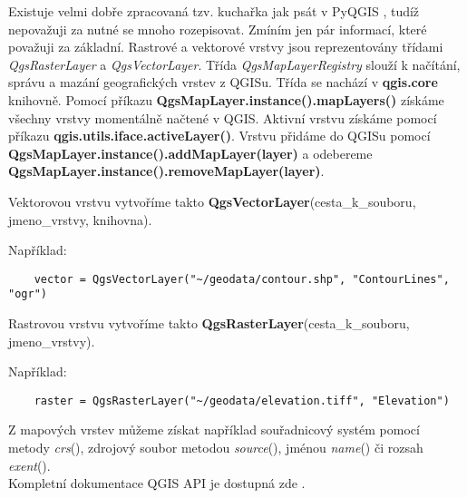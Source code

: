 Existuje velmi dobře zpracovaná tzv. kuchařka jak psát v PyQGIS \cite{pyqgis:www}, tudíž nepovažuji za nutné se mnoho rozepisovat. Zmíním jen pár informací, které považuji za základní. Rastrové a vektorové vrstvy jsou reprezentovány třídami \textit{QgsRasterLayer} a \textit{QgsVectorLayer}. Třída \textit{QgsMapLayerRegistry} slouží k načítání, správu a mazání geografických vrstev z QGISu. Třída se nachází v \textbf{qgis.core} knihovně. Pomocí příkazu \textbf{QgsMapLayer.instance().mapLayers()} získáme všechny vrstvy momentálně načtené v QGIS. Aktivní vrstvu získáme pomocí příkazu \textbf{qgis.utils.iface.activeLayer()}. Vrstvu přidáme do QGISu pomocí \textbf{QgsMapLayer.instance().addMapLayer(layer)} a odebereme \textbf{QgsMapLayer.instance().removeMapLayer(layer)}. 

Vektorovou vrstvu vytvoříme takto \textbf{QgsVectorLayer}(cesta\_k\_souboru, jmeno\_vrstvy, knihovna).

Například:

\begin{lstlisting}
	vector = QgsVectorLayer("~/geodata/contour.shp", "ContourLines", "ogr")
\end{lstlisting}

Rastrovou vrstvu vytvoříme takto \textbf{QgsRasterLayer}(cesta\_k\_souboru, jmeno\_vrstvy).

Například:

\begin{lstlisting}
	raster = QgsRasterLayer("~/geodata/elevation.tiff", "Elevation")
\end{lstlisting}

Z mapových vrstev můžeme získat například souřadnicový systém pomocí metody \textit{crs}(), zdrojový soubor metodou \textit{source}(), jménou \textit{name}() či rozsah \textit{exent}().\\

Kompletní dokumentace QGIS API je dostupná zde \cite{qgis_api:www}.







